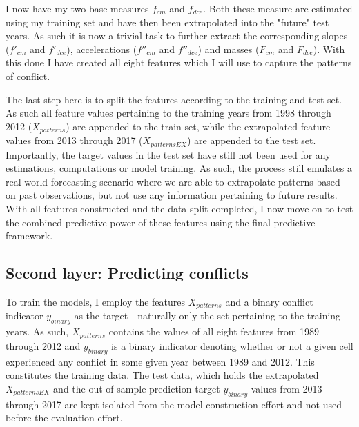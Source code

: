 \documentclass[a4paper]{article}
\begin{document}
I now have my two base measures $f_{cm}$ and $f_{dce}$. Both these measure are estimated using my training set and have then been extrapolated into the "future" test years. As such it is now a trivial task to further extract the corresponding slopes ($f'_{cm}$ and $f'_{dce}$), accelerations ($f''_{cm}$ and $f''_{dce}$) and masses ($F_{cm}$ and $F_{dce}$). With this done I have created all eight features which I will use to capture the patterns of conflict.\par

The last step here is to split the features according to the training and test set. As such all feature values pertaining to the training years from 1998 through 2012 ($X_{patterns}$) are appended to the train set, while the extrapolated feature values from 2013 through 2017 ($X_{patternsEX}$) are appended to the test set. Importantly, the target values in the test set have still not been used for any estimations, computations or model training. As such, the process still emulates a real world forecasting scenario where we are able to extrapolate patterns based on past observations, but not use any information pertaining to future results. With all features constructed and the data-split completed, I now move on to test the combined predictive power of these features using the final predictive framework.\par

\subsection{Second layer: Predicting conflicts}


To train the models, I employ the features $X_{patterns}$ and a binary conflict indicator $y_{binary}$ as the target - naturally only the set pertaining to the training years. As such, $X_{patterns}$ contains the values of all eight features from 1989 through 2012 and $y_{binary}$ is a binary indicator denoting whether or not a given cell experienced any conflict in some given year between 1989 and 2012. This constitutes the training data. The test data, which holds the extrapolated $X_{patternsEX}$ and the out-of-sample prediction target $y_{binary}$ values from 2013 through 2017 are kept isolated from the model construction effort and not used before the evaluation effort.\par
\end{document}
